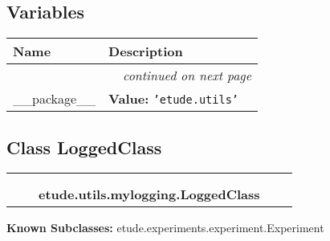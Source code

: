 
  \subsection{Variables}

    \vspace{-1cm}
\hspace{\varindent}\begin{longtable}{|p{\varnamewidth}|p{\vardescrwidth}|l}
\cline{1-2}
\cline{1-2} \centering \textbf{Name} & \centering \textbf{Description}& \\
\cline{1-2}
\endhead\cline{1-2}\multicolumn{3}{r}{\small\textit{continued on next page}}\\\endfoot\cline{1-2}
\endlastfoot\raggedright \_\-\_\-p\-a\-c\-k\-a\-g\-e\-\_\-\_\- & \raggedright \textbf{Value:} 
{\tt \texttt{'}\texttt{etude.utils}\texttt{'}}&\\
\cline{1-2}
\end{longtable}



\subsection{Class LoggedClass}

    \label{etude:utils:mylogging:LoggedClass}
\begin{tabular}{cccccc}
\multicolumn{2}{r}{\settowidth{\BCL}{object}\multirow{2}{\BCL}{object}}
&&
  \\\cline{3-3}
  &&\multicolumn{1}{c|}{}
&&
  \\
&&\multicolumn{2}{l}{\textbf{etude.utils.mylogging.LoggedClass}}
\end{tabular}

\textbf{Known Subclasses:} etude.experiments.experiment.Experiment



